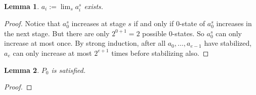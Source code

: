 \documentclass{article}
\newtheorem{lemma}{Lemma}[subsection]
\begin{document}
  \begin{lemma}
    $a_i:=\lim_s a_i^s$ exists.
  \end{lemma}
  \begin{proof}
    Notice that $a_0^s$ increases at stage $s$ if and only if $0$-state of
    $a_0^s$ increases in the next stage. But there are only $2^{0+1}=2$
    possible $0$-states. So $a_0^s$ can only increase at most once. By
    strong induction, after all $a_0,\ldots,a_{e-1}$ have stabilized, $a_e$
    can only increase at most $2^{e+1}$ times before stabilizing also.
  \end{proof}

  \begin{lemma}
    $P_0$ is satisfied.
  \end{lemma}
  \begin{proof}
  \end{proof}
\end{document}
